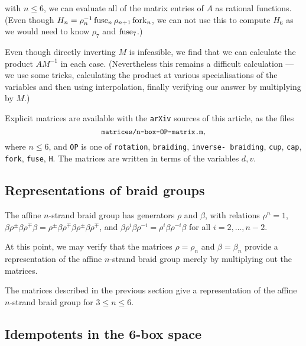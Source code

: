 \documentclass[12pt]{amsart}
\begin{document}
with $n \leq 6$,
we can evaluate all of the matrix entries of $A$ as rational functions.
(Even though $H_n = \rho_{n}^{-1} \operatorname{fuse}_n \rho_{n+1} \operatorname{fork}_n$, we can not
use this to compute $H_6$ as we would need to know $\rho_7$ and $\operatorname{fuse}_7$.)

Even though directly inverting $M$ is infeasible, we find that we can
calculate the product $A M^{-1}$ in each case. (Nevertheless this remains a
difficult calculation ---  we use some tricks, calculating the product at
various specialisations of the variables and then using interpolation, finally
verifying our answer by multiplying by $M$.)

Explicit matrices are available with the {\tt arXiv} sources of this article,
as the files $$\text{{\small\tt matrices/n-box-OP-matrix.m}},$$ where $n \leq
6$, and {\tt OP} is one of {\tt rotation}, {\tt braiding}, {\tt inverse-%
braiding}, {\tt cup}, {\tt cap}, {\tt fork}, {\tt fuse}, {\tt H}.  The
matrices are written in terms of the variables $d, v$.


\subsection{Representations of braid groups}
The affine $n$-strand braid group has generators $\rho$ and $\beta$, with
relations $\rho^n = 1$, $\beta \rho^\pm \beta \rho^\mp \beta = \rho^\pm \beta
\rho^\mp \beta \rho^\pm \beta \rho^\mp$, and $\beta \rho^i \beta \rho^{-i} =
\rho^i \beta \rho^ {-i} \beta$ for all $i = 2, \ldots, n-2$.

At this point, we may verify that the matrices $\rho = \rho_n$ and $\beta =
\beta_n$ provide a representation of the affine $n$-strand braid group merely
by multiplying out the matrices.

\begin{lemma}
The matrices described in the previous section give a representation of the affine $n$-strand braid group for $3 \leq n \leq 6$.
\end{lemma}


\subsection{Idempotents in the 6-box space}
\end{document}

